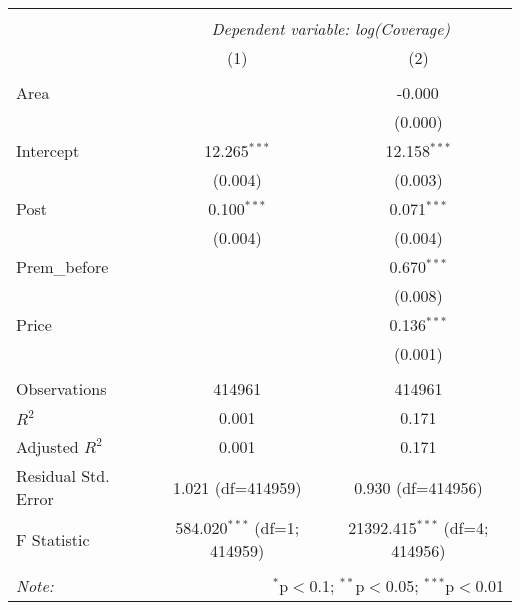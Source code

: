 
\begin{tabular}{@{\extracolsep{5pt}}lcc}
\\[-1.8ex]\hline
\hline \\[-1.8ex]
& \multicolumn{2}{c}{\textit{Dependent variable: log(Coverage)}} \
\cr \cline{2-3}
\\[-1.8ex] & (1) & (2) \\
\hline \\[-1.8ex]
 Area & & -0.000$^{}$ \\
& & (0.000) \\
 Intercept & 12.265$^{***}$ & 12.158$^{***}$ \\
& (0.004) & (0.003) \\
 Post & 0.100$^{***}$ & 0.071$^{***}$ \\
& (0.004) & (0.004) \\
 Prem\_before & & 0.670$^{***}$ \\
& & (0.008) \\
 Price & & 0.136$^{***}$ \\
& & (0.001) \\
\hline \\[-1.8ex]
 Observations & 414961 & 414961 \\
 $R^2$ & 0.001 & 0.171 \\
 Adjusted $R^2$ & 0.001 & 0.171 \\
 Residual Std. Error & 1.021 (df=414959) & 0.930 (df=414956) \\
 F Statistic & 584.020$^{***}$ (df=1; 414959) & 21392.415$^{***}$ (df=4; 414956) \\
\hline
\hline \\[-1.8ex]
\textit{Note:} & \multicolumn{2}{r}{$^{*}$p$<$0.1; $^{**}$p$<$0.05; $^{***}$p$<$0.01} \\
\end{tabular}
